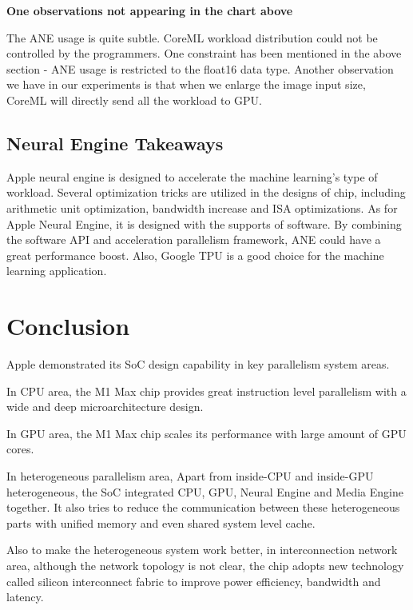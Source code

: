 \documentclass[11pt]{article}
\begin{document}
\textbf{One observations not appearing in the chart above}

The ANE usage is quite subtle. CoreML workload distribution could not be controlled by the programmers. One constraint has been mentioned in the above section - ANE usage is restricted to the float16 data type. Another observation we have in our experiments is that when we enlarge the image input size, CoreML will directly send all the workload to GPU.

\subsection*{Neural Engine Takeaways}
Apple neural engine is designed to accelerate the machine learning's type of workload. Several optimization tricks are utilized in the designs of chip, including arithmetic unit optimization, bandwidth increase and ISA optimizations. As for Apple Neural Engine, it is designed with the supports of software. By combining the software API and acceleration parallelism framework, ANE could have a great performance boost. Also, Google TPU is a good choice for the machine learning application.


\newpage
\section{Conclusion}
Apple demonstrated its SoC design capability in key parallelism system areas.

In CPU area, the M1 Max chip provides great instruction level parallelism with a wide and deep microarchitecture design.

In GPU area, the M1 Max chip scales its performance with large amount of GPU cores.

In heterogeneous parallelism area, Apart from inside-CPU and inside-GPU heterogeneous, the SoC integrated CPU, GPU, Neural Engine and Media Engine together. It also tries to reduce the communication between these heterogeneous parts with unified memory and even shared system level cache.

Also to make the heterogeneous system work better, in interconnection network area, although the network topology is not clear, the chip adopts new technology called silicon interconnect fabric to improve power efficiency, bandwidth and latency. 
\end{document}
